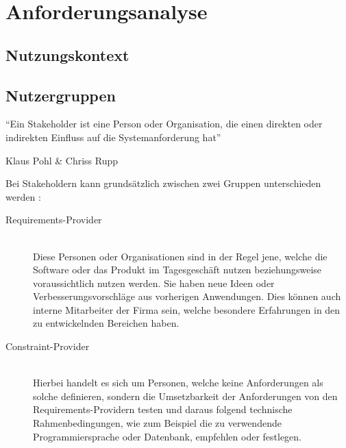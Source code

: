 \chapter{Anforderungsanalyse}
\label{kap:anforderungsanalyse}
\minitoc\pagebreak

\section{Nutzungskontext}
\label{sec:kontext}
\todo{}



\section{Nutzergruppen}
\label{sec:nutzergruppen}
\epigraph{"`Ein Stakeholder ist eine Person oder Organisation, die einen direkten oder indirekten Einfluss auf die Systemanforderung hat"'} {Klaus Pohl \& Chriss Rupp \cite[S.29]{Pohl.2011}}

Bei Stakeholdern kann grundsätzlich zwischen zwei Gruppen unterschieden werden \cite{Leffingwell.2011}:
\begin{description}
\item [Requirements-Provider] \hfill \\
Diese Personen oder Organisationen sind in der Regel jene, welche die Software oder das Produkt im Tagesgeschäft nutzen beziehungsweise voraussichtlich nutzen werden.
Sie haben neue Ideen oder Verbesserungsvorschläge aus vorherigen Anwendungen.
Dies können auch interne Mitarbeiter der Firma sein, welche besondere Erfahrungen in den zu entwickelnden Bereichen haben. %
\item [Constraint-Provider] \hfill \\
Hierbei handelt es sich um Personen, welche keine Anforderungen als solche definieren, sondern die Umsetzbarkeit der Anforderungen von den Requirements-Providern testen und daraus folgend technische Rahmenbedingungen, wie zum Beispiel die zu verwendende  Programmiersprache oder Datenbank, empfehlen oder festlegen.
\end{description}

